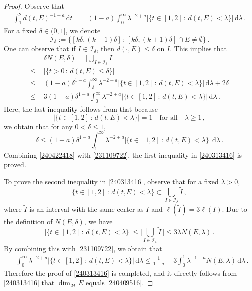 \documentclass[10pt,a4paper]{amsart}
\newcommand{\cI}{\mathcal{I}}
\newcommand{\cM}{\mathcal{M}}
\newcommand{\dd}{\,\mathrm{d}}
\begin{document}
\begin{proof}
Observe that
\begin{align}\label{231109722}
    \int_1^2d(t,E)^{-1+a}\dd t&=(1-a) \int_0^\infty \lambda^{-2+a}\big|\{t\in[1,2]\,:\,d(t,E)<\lambda\}\big|\dd \lambda\,.
\end{align}
For a fixed $\delta\in(0,1]$, we denote 
$$
\cI_\delta:=\big\{[k\delta,(k+1)\delta]\,:\,[k\delta,(k+1)\delta]\cap E\neq \emptyset\big\}\,.
$$
One can observe that if $I\in\cI_\delta$, then $d(\cdot,E)\leq \delta$ on $I$.
This implies that
\begin{align}\label{240422418}
&\delta N(E,\delta)=\bigg|\bigcup_{I\in \cI_\delta}I\bigg| \nonumber\\
\leq \,\,&\big|\{t>0\,:\,d(t,E)\leq \delta\}\big|\\
\leq \,\,&
(1-a)\delta^{1-a}\int_\delta^\infty \lambda^{-2+a}\big|\{t\in [1,2]\,:\,d(t,E)<\lambda\}\big|\dd \lambda+2\delta\nonumber\\
\leq \,\,&3(1-a)\delta^{1-a}\int_0^\infty \lambda^{-2+a}\big|\{t\in [1,2]\,:\,d(t,E)<\lambda\}\big|\dd \lambda\,.\nonumber
\end{align}
Here, the last inequality follows from that because 
$$
|\{t\in [1,2]\,:\,d(t,E)<\lambda\}|=1\quad \text{for all}\quad \lambda\geq 1\,,
$$
we obtain that for any $0<\delta\leq 1$,
$$
\delta\leq (1-a)\delta^{1-a} \int_1^\infty \lambda^{-2+a}|\{t\in [1,2]\,:\,d(t,E)<\lambda\}|\dd \lambda\,.
$$
Combining \eqref{240422418} with \eqref{231109722}, the first inequality in \eqref{240313416} is proved.

To prove the second inequality in \eqref{240313416}, 
observe that for a fixed $\lambda>0$,
$$
\big\{t\in[1,2]\,:\,d(t,E)<\lambda\big\}\subset \bigcup_{I\in\cI_\lambda}\widetilde{I}\,,
$$
where $\widetilde{I}$ is an interval with the same center as $I$ and $\ell(\widetilde{I})=3\ell(I)$.
Due to the definition of $N(E,\delta)$, we have
$$
\big|\big\{t\in[1,2]\,:\,d(t,E)<\lambda\big\}\big|\leq \bigg|\bigcup_{I\in \cI_\lambda}\widetilde{I}\,\bigg|\leq 3\lambda N(E,\lambda)\,.
$$
By combining this with \eqref{231109722}, we obtain that
\begin{align*}
&\int_0^\infty \lambda^{-2+a}|\{t\in[1,2]\,:\,d(t,E)<\lambda\}|\dd \lambda\leq \frac{1}{1-a}+3\int_0^1\lambda^{-1+a}N(E,\lambda)\dd \lambda\,.
\end{align*}
Therefore the proof of \eqref{240313416} is completed, and
it directly follows from \eqref{240313416} that $\dim_\cM E$ equals \eqref{240409516}.
\end{proof}
\end{document}

